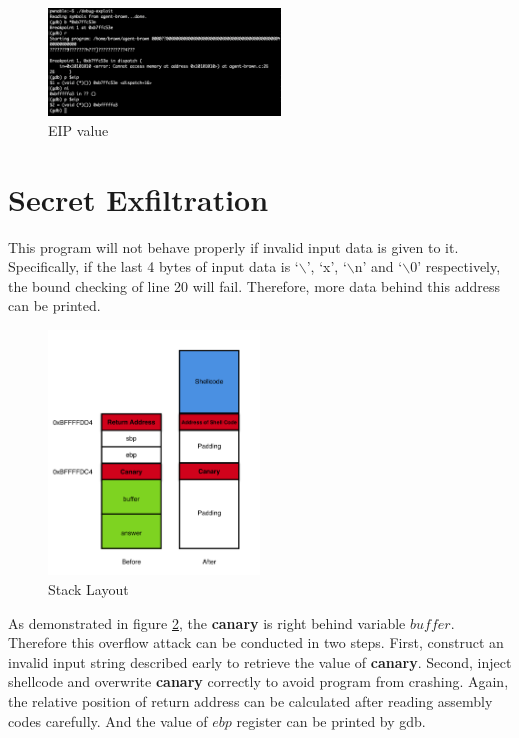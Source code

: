 \documentclass{article}
\begin{document}
\begin{figure}[h]
\centering
\includegraphics[width=0.55\textwidth]{gdb4.png}
\caption{\label{fig:gdb4}EIP value}
\end{figure}

\newpage
\section{Secret Exfiltration}

This program will not behave properly if invalid input data is given to it. Specifically, if the last 4 bytes of input data is `$\backslash$', `x', `$\backslash$n' and `$\backslash$0' respectively, the bound checking of line 20 will fail. Therefore, more data behind this address can be printed.

\begin{figure}[h]
\centering
\includegraphics[width=0.5\textwidth]{stack4.png}
\caption{\label{fig:stack4}Stack Layout}
\end{figure}

As demonstrated in figure \ref{fig:stack4}, the \textbf{canary} is right behind variable $buffer$. Therefore this overflow attack can be conducted in two steps. First, construct an invalid input string described early to retrieve the value of \textbf{canary}. Second, inject shellcode and overwrite \textbf{canary} correctly to avoid program from crashing. Again, the relative position of return address can be calculated after reading assembly codes carefully. And the value of $ebp$ register can be printed by gdb.
\end{document}
